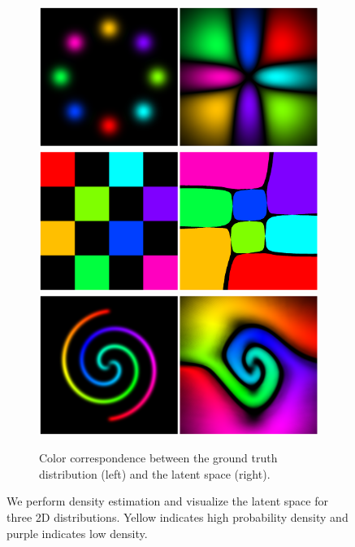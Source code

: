 \documentclass{article}
\begin{document}
\begin{figure}[t]
\begin{subfigure}[b]{0.48\textwidth}
        \centering
                \includegraphics[width=\linewidth]{figures/color8g.png}
                \includegraphics[width=\linewidth]{figures/colorc.png}
                \includegraphics[width=\linewidth]{figures/color2s.png}
        \caption{Color correspondence between the ground truth distribution (left) and the latent space (right).}
        \label{fig:latent}
    \end{subfigure}
    \caption{We perform density estimation and visualize the latent space for three 2D distributions. Yellow indicates high probability density and purple indicates low density.}
    \label{fig:typical}
\end{figure}
\end{document}
